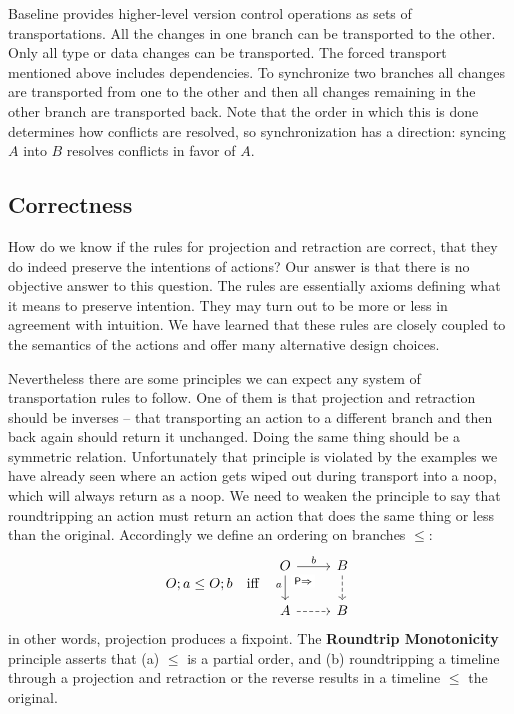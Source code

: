 \documentclass[english,submission]{programming}
\theoremstyle{definition}
\newcommand{\mathbox}[1]{\colorbox{black!10}{$#1$}}
\begin{document}
Baseline provides higher-level version control operations as sets of transportations. All the changes in one branch can be transported to the other. Only all type or data changes can be transported. The forced transport mentioned above includes dependencies. To synchronize two branches all changes are transported from one to the other and then all changes remaining in the other branch are transported back. Note that the order in which this is done determines how conflicts are resolved, so synchronization has a direction: syncing $A$ into $B$ resolves conflicts in favor of $A$.



\subsection{Correctness}

How do we know if the rules for projection and retraction are correct, that they do indeed preserve the intentions of actions? Our answer is that there is no objective answer to this question. The rules are essentially axioms defining what it means to preserve intention. They may turn out to be more or less in agreement with intuition. We have learned that these rules are closely coupled to the semantics of the actions and offer many alternative design choices.

Nevertheless there are some principles we can expect any system of transportation rules to follow. One of them is that projection and retraction should be inverses -- that transporting an action to a different branch and then back again should return it unchanged. Doing the same thing should be a symmetric relation. Unfortunately that principle is violated by the examples we have already seen where an action gets wiped out during transport into a \textsf{noop}, which will always return as a \textsf{noop}. We need to weaken the principle to say that roundtripping an action must return an action that does the same thing or less than the original. Accordingly we define an ordering on branches \mathbox{\leq}:
\[
O; a \leq O; b \quad\textrm{iff} \quad
\begin{tikzcd}
	O & B \\
	A & B
	\arrow["{b}", from=1-1, to=1-2]
	\arrow["{a}"'{pos=0.4}, from=1-1, to=2-1]
	\arrow["{\textsf{P}\Rightarrow}"{description, pos=0.2}, draw=none, from=1-1, to=2-2]
	\arrow[dashed, from=1-2, to=2-2]
	\arrow[dashed, from=2-1, to=2-2]
\end{tikzcd}
\]
in other words, projection produces a fixpoint. The \textbf{Roundtrip Monotonicity} principle asserts that (a) \mathbox{\leq} is a partial order, and (b) roundtripping a timeline through a projection and retraction or the reverse results in a timeline $\leq$ the original.
\end{document}
